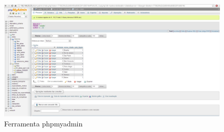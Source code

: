 \documentclass[10pt]{article}
\begin{document}
\begin{center}
\begin{figure}[h!]
\includegraphics[scale=0.25]{phpmyadmin.jpg}
\caption{Ferramenta phpmyadmin}
\end{figure}
\end{center}
\end{document}
